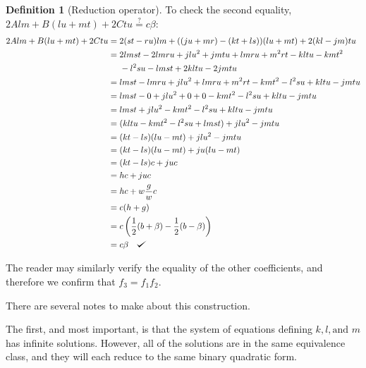 \documentclass{article}
\def\checkmark{\tikz\fill[scale=0.4](0,.35) -- (.25,0) -- (1,.7) -- (.25,.15) -- cycle;}
\theoremstyle{definition}
\newtheorem{definition}{Definition}[section]
\theoremstyle{theorem}
\theoremstyle{example}
\theoremstyle{corollary}
\begin{document}
\begin{definition}[Reduction operator]
To check the second equality, \(2 A l m + B (l u + m t) + 2 C t u \stackrel{?}{=} c \beta\):
\begin{align*}
2 A l m + B (l u + m t) + 2 C t u &= 2 (s t - r u) l m + ((j u  + m r) - (k t + l s)) (l u + m t) + 2 (k l - j m) t u \\
&= 2lmst - 2lmru + jlu^{2} + jmtu + lmru + m^{2}rt - kltu - kmt^{2} \\
&\phantom{=l} - l^{2}su - lmst + 2kltu - 2jmtu \\
&= lmst - lmru + jlu^{2} + lmru + m^{2}rt - kmt^{2} - l^{2}su + kltu - jmtu \\
&= lmst - 0 + jlu^{2} + 0 + 0 - kmt^{2} - l^{2}su + kltu - jmtu \\
&= lmst + jlu^{2} - kmt^{2} - l^{2}su + kltu - jmtu \\
&= (kltu - kmt^{2} - l^{2}su + lmst) + jlu^{2} - jmtu \\
&= (kt - ls) (lu - mt) + jlu^{2} - jmtu \\
&= (kt - ls) (lu - mt) + j u (lu - mt) \\
&= (kt - ls) c + ju c \\
&= hc + ju c\\
&= hc + w \frac{g}{w} c\\
&= c(h + g)\\
&= c \left(\frac{1}{2} (b + \beta) - \frac{1}{2} (b - \beta)\right) \\
&= c \beta \quad \checkmark
\end{align*}

\bigskip

The reader may similarly verify the equality of the other coefficients, and therefore we confirm that \(f_{3} = f_{1} f_{2}\).

\bigskip

There are several notes to make about this construction.

\bigskip

The first, and most important, is that the system of equations defining \(k, l, \textrm{and } m\) has infinite solutions. However, all of the solutions are in the same equivalence class, and they will each reduce to the same binary quadratic form.
\bigskip


\end{definition}
\end{document}
